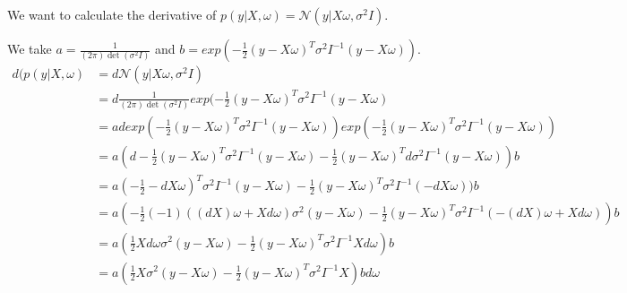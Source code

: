 We want to calculate the derivative of $p(y|X, \omega) = \mathcal{N} (y|X\omega, \sigma^{2}I)$.

We take $a = \frac{1}{(2\pi)\det(\sigma^{2}I)}$ and $b = exp(-\frac{1}{2}(y - X\omega)^{T}\sigma^{2}I^{-1}(y - X\omega))$.
\begin{align*}
	d(p(y|X, \omega) 
	&= d\mathcal{N}(y|X\omega, \sigma^{2}I) \\
	&= d \frac{1}{(2\pi)\det(\sigma^{2}I)}exp(-\frac{1}{2}(y - X\omega)^{T}\sigma^{2}I^{-1}(y - X\omega) \\
	&= a d exp(-\frac{1}{2}(y-X\omega)^{T}\sigma^{2}I^{-1}(y-X\omega)) exp(-\frac{1}{2}(y - X\omega)^{T}\sigma^{2}I^{-1}(y - X\omega))\\ 
	&= a(d-\frac{1}{2}(y-X\omega)^{T}\sigma^{2}I^{-1} (y-X\omega) - \frac{1}{2}(y-X\omega)^{T} d\sigma^{2} I^{-1}(y -X\omega)) b \\ 
	&= a(-\frac{1}{2} - dX\omega)^{T} \sigma^{2}I^{-1}(y-X\omega) - \frac{1}{2}(y-X\omega)^{T} \sigma^{2} I^{-1}(-dX\omega)) b \\
	&= a (-\frac{1}{2} (-1)((dX)\omega + Xd\omega) \sigma^{2}(y-X\omega) - \frac{1}{2}(y-X\omega)^{T} \sigma^{2} I^{-1}(-(dX)\omega + Xd\omega)) b \\
	&= a(\frac{1}{2} Xd\omega \sigma^{2} (y-X\omega) - \frac{1}{2}(y-X\omega)^{T} \sigma^{2} I^{-1} Xd\omega) b \\
	&= a(\frac{1}{2} X \sigma^{2} (y-X\omega) - \frac{1}{2}(y-X\omega)^{T} \sigma^{2} I^{-1} X) b d\omega
\end{align*}